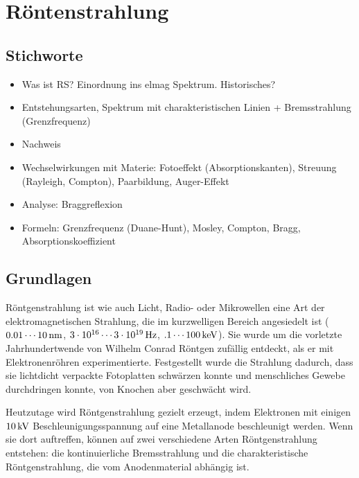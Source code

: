 \documentclass[a4paper]{scrartcl}
\begin{document}
\setcounter{tocdepth}{1}
\tableofcontents
\pagebreak

\section{Röntenstrahlung}
\subsection{Stichworte}
\begin{itemize}[noitemsep]
  \item Was ist RS? Einordnung ins elmag Spektrum. Historisches?
  \item Entstehungsarten, Spektrum mit charakteristischen Linien + Bremsstrahlung (Grenzfrequenz)
  \item Nachweis
  \item Wechselwirkungen mit Materie: Fotoeffekt (Absorptionskanten), Streuung (Rayleigh, Compton), Paarbildung, Auger-Effekt
  \item Analyse: Braggreflexion
  \item Formeln: Grenzfrequenz (Duane-Hunt), Mosley, Compton, Bragg, Absorptionskoeffizient
\end{itemize}

\subsection{Grundlagen}
Röntgenstrahlung ist wie auch Licht, Radio- oder Mikrowellen eine Art der elektromagnetischen Strahlung, die im kurzwelligen Bereich angesiedelt ist ($\unit[0.01\cdots10]{nm}$, $\unit[3\cdot10^{16}\cdots 3\cdot 10^{19}]{Hz}$, $\unit[.1\cdots100]{keV}$). Sie wurde um die vorletzte Jahrhundertwende von Wilhelm Conrad Röntgen zufällig entdeckt, als er mit Elektronenröhren experimentierte. Festgestellt wurde die Strahlung dadurch, dass sie lichtdicht verpackte Fotoplatten schwärzen konnte und menschliches Gewebe durchdringen konnte, von Knochen aber geschwächt wird.

Heutzutage wird Röntgenstrahlung gezielt erzeugt, indem Elektronen mit einigen $\unit[10]{kV}$ Beschleunigungsspannung auf eine Metallanode beschleunigt werden. Wenn sie dort auftreffen, können auf zwei verschiedene Arten Röntgenstrahlung entstehen: die kontinuierliche Bremsstrahlung und die charakteristische Röntgenstrahlung, die vom Anodenmaterial abhängig ist.
\end{document}

